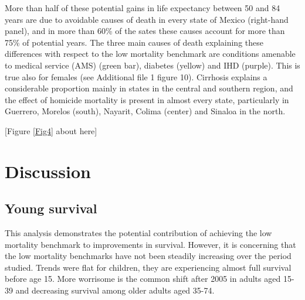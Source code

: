 \documentclass{bmcart}
\begin{document}
More than half of these potential gains in life expectancy between 50 and 84 years are due to avoidable causes of death in every state of Mexico (right-hand panel), and in more than 60\% of the sates these causes account for more than 75\% of potential years. The three main causes of death explaining these differences with respect to the low mortality benchmark are conditions amenable to medical service (AMS) (green bar), diabetes (yellow) and IHD (purple). This is true also for females (see Additional file 1 figure 10). Cirrhosis explains a considerable proportion mainly in states in the central and southern region, and the effect of homicide mortality is present in almost every state, particularly in Guerrero, Morelos (south), Nayarit, Colima (center) and Sinaloa in the north. 

\begin{center}
[Figure \ref{Fig4} about here]
\end{center}



\section*{Discussion}
\subsection*{Young survival}

This analysis demonstrates the potential contribution of achieving the low mortality benchmark to improvements in survival. However, it is concerning that the low mortality benchmarks have not been steadily increasing over the period studied. Trends were flat for children, they are experiencing almost full survival before age 15. More worrisome is the common shift after 2005 in adults aged 15-39 and decreasing survival among older adults aged 35-74.
\end{document}
